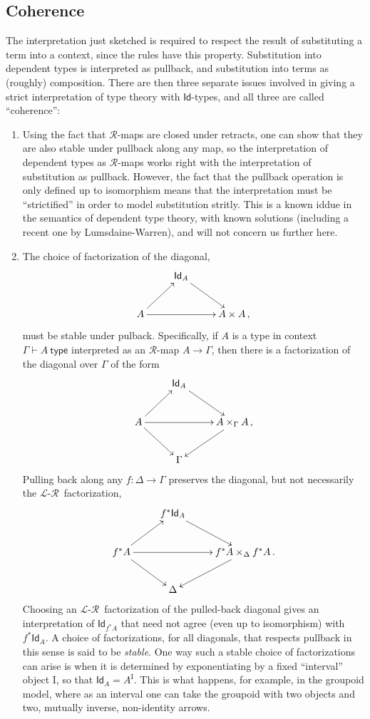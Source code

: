 \documentclass[12pt]{article}
\renewcommand{\L}{\ensuremath{\mathcal{L}}}
\newcommand{\R}{\ensuremath{\mathcal{R}}}
\newcommand{\arr}{\ensuremath{\rightarrow}}
\newcommand{\I}{\ensuremath{\mathrm{I}}}
\newcommand{\G}{\ensuremath{\Gamma}}
\newcommand{\type}{\mathsf{type}}
\newcommand{\types}[2]{#1 \vdash #2\ \type}
\newcommand{\Gtypes}[1]{\types{\Gamma}{#1}}
\newcommand{\Id}{\ensuremath{\mathsf{Id}}}
\newcommand{\id}[1]{\Id_{#1}}
\theoremstyle{remark}
\theoremstyle{definition}
\begin{document}
\subsection{Coherence}

The interpretation just sketched is required to respect the result of substituting a term into a context, since the rules have this property.  Substitution into dependent types is interpreted as pullback, and substitution into terms as (roughly) composition. There are then three separate issues involved in giving a strict interpretation of type theory with \Id-types, and all three are called ``coherence'':

\begin{enumerate}

\item Using the fact that \R-maps are closed under retracts, one can show that they are also stable under pullback along any map, so the interpretation of dependent types as \R-maps works right with the interpretation of substitution as pullback.  However, the fact that the pullback operation is only defined up to isomorphism means that the interpretation must be ``strictified'' in order to model substitution stritly.  This is a known iddue in the semantics of dependent type theory, with known solutions (including a recent one by Lumsdaine-Warren), and will not concern us further here.

\item The choice of factorization of the diagonal,
\[
\xymatrix{
& \id{A} \ar[rd] &\\
A \ar[rr] \ar[ru] && A\times A\,,
}
\]
must be stable under pulback.  Specifically, if $A$ is a type in context $\Gtypes{A}$ interpreted as an \R-map $A\arr\G$, then there is a factorization of the diagonal over $\G$ of the form
\[
\xymatrix{
& \id{A} \ar[rd] &\\
A \ar[rr] \ar[ru] \ar[rd] && \ar[ld] A\times_{\G} A\,,\\
& \G &
}
\]
Pulling back along any $f : \Delta \to \G$ preserves the diagonal, but not necessarily the \L-\R\ factorization, 
\[
\xymatrix{
& f^*\id{A} \ar[rd] &\\
f^*A \ar[rr] \ar[ru] \ar[rd] && \ar[ld] f^*A\times_{\Delta} f^*A\,.\\
& \Delta &
}
\]
Choosing an \L-\R\ factorization of the pulled-back diagonal gives an interpretation of $\id{f^*A}$ that need not agree (even up to isomorphism) with $f^*\id{A}$.  A choice of factorizations, for all diagonals, that respects pullback in this sense is said to be \emph{stable}.  One way such a stable choice of factorizations can arise is when it is determined by exponentiating by a fixed ``interval'' object $\I$, so that $ \id{A}=A^\I$. This is what happens, for example, in the groupoid model, where as an interval one can take the groupoid with two objects and two, mutually inverse, non-identity arrows.


\end{enumerate}
\end{document}

